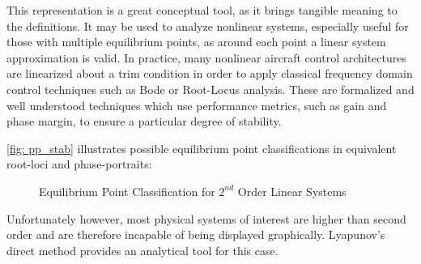 \documentclass[12pt]{ucthesis}
\begin{document}
This representation is a great conceptual tool, as it brings tangible meaning to the definitions. It may be used to analyze nonlinear systems, especially useful for those with multiple equilibrium points, as around each point a linear system approximation is valid. In practice, many nonlinear aircraft control architectures are linearized about a trim condition in order to apply classical frequency domain control techniques such as Bode or Root-Locus analysis. These are formalized and well understood techniques which use performance metrics, such as gain and phase margin, to ensure a particular degree of stability. 

\autoref{fig: pp_stab} illustrates possible equilibrium point classifications in equivalent root-loci and phase-portraits:%
	\begin{figure}[H]
		\centering%
		\caption{Equilibrium Point Classification for $2^{nd}$ Order Linear Systems \cite{Slotine1991}}%
		\label{fig: pp_stab}
	\end{figure}
%
Unfortunately however, most physical systems of interest are higher than second order and are therefore incapable of being displayed graphically. Lyapunov's direct method provides an analytical tool for this case.
\end{document}
